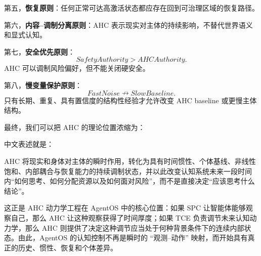 第五，\textbf{恢复原则}：任何正常可达高激活状态都应存在回到可治理区域的恢复路径。

第六，\textbf{内容--调制分离原则}：AHC 表示现实对主体的持续影响，不替代世界语义和显式认知。

第七，\textbf{安全优先原则}：
\[
SafetyAuthority>AHCAuthority.
\]
AHC 可以调制风险偏好，但不能关闭硬安全。

第八，\textbf{慢变量保护原则}：
\[
FastNoise\nrightarrow SlowBaseline.
\]
只有长期、重复、具有置信度的结构性经验才允许改变 AHC baseline 或更慢主体结构。

最终，我们可以把 AHC 的理论位置浓缩为：
\begin{statementbox}
\centering
{}
\end{statementbox}

中文表述就是：

\begin{statementbox}
AHC 将现实和身体对主体的瞬时作用，转化为具有时间惯性、个体基线、非线性饱和、内部耦合与恢复能力的持续调制状态，并以此改变认知系统未来一段时间内“如何思考、如何分配资源以及如何面对风险”，而不是直接决定“应该思考什么结论”。
\end{statementbox}

这正是 AHC 动力学工程在 AgentOS 中的核心位置：如果 SPC 让智能体能够观察自己，那么 AHC 让这种观察获得了时间厚度；如果 TCE 负责调节未来认知动力学，那么 AHC 则提供了决定这种调节应当处于何种背景条件下的连续内部状态。由此，AgentOS 的认知控制不再是瞬时的 ``观测--动作'' 映射，而开始具有真正的历史、惯性、恢复和个体差异。
